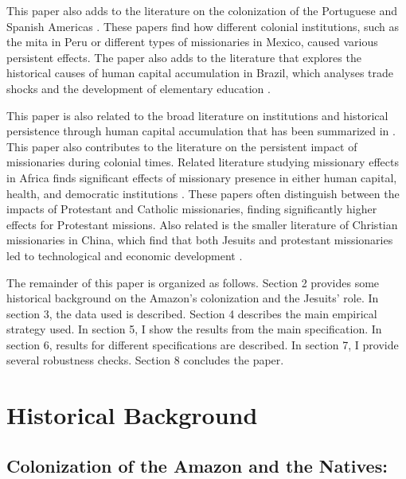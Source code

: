 \documentclass{article}
\begin{document}
This paper also adds to the literature on the colonization of the Portuguese and Spanish Americas \parencite{Alston2022-fp, Barsanetti2021-hp, Franco2021-vn, Waldinger2017-rz, Dell2010-qt}.
These papers find how different colonial institutions, such as the mita in Peru or different types of missionaries in Mexico, caused various persistent effects. 
The paper also adds to the literature that explores the historical causes of human capital accumulation in Brazil, which analyses trade shocks and the development of elementary education \parencite{Musacchio2014-pq}.

This paper is also related to the broad literature on institutions and historical persistence through human capital accumulation that has been summarized in \textcite{Nunn2010-ls}. This paper also contributes to the literature on the persistent impact of missionaries during colonial times. Related literature studying missionary effects in Africa finds significant effects of missionary presence in either human capital, health, and democratic institutions \parencite{Cage2020-wc, Cage2016-kk, Wantchekon2015-ry, Nunn2014-tj, Woodberry2012-es, Nunn2010-ls, Gallego2010-bn}. These papers often distinguish between the impacts of Protestant and Catholic missionaries, finding significantly higher effects for Protestant missions.  Also related is the smaller literature of Christian missionaries in China, which find that both Jesuits and protestant missionaries led to technological and economic development \parencite{Ma2021-sb, Bai2015-kq}. 

The remainder of this paper is organized as follows. 
Section 2 provides some historical background on the Amazon's colonization and the Jesuits' role. 
In section 3, the data used is described. Section 4 describes the main empirical strategy used. 
In section 5, I show the results from the main specification.
In section 6, results for different specifications are described. 
In section 7, I provide several robustness checks. 
Section 8 concludes the paper. 

\section{Historical Background}

\subsection{Colonization of the Amazon and the Natives:}
\end{document}
